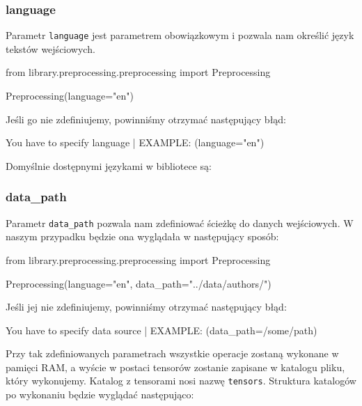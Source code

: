 \subsubsection{language}
Parametr \texttt{language} jest parametrem obowiązkowym i pozwala nam określić język tekstów wejściowych.
\begin{python}
from library.preprocessing.preprocessing import Preprocessing

Preprocessing(language="en")

\end{python}

Jeśli go nie zdefiniujemy, powinniśmy otrzymać następujący błąd:

\begin{consolerror}
You have to specify language | EXAMPLE: (language="en")
\end{consolerror}

Domyślnie dostępnymi językami w bibliotece są:

\languages 

\subsubsection{data\_path}
Parametr \texttt{data\_path} pozwala nam zdefiniować ścieżkę do danych wejściowych. W naszym przypadku
będzie ona wyglądała w następujący sposób:
\begin{python}
from library.preprocessing.preprocessing import Preprocessing

Preprocessing(language="en",
              data_path="../data/authors/")
                   
\end{python}

Jeśli jej nie zdefiniujemy, powinniśmy otrzymać następujący błąd:

\begin{consolerror}
You have to specify data source | EXAMPLE: (data_path=/some/path)
\end{consolerror}

Przy tak zdefiniowanych parametrach wszystkie operacje zostaną wykonane w pamięci RAM, a wyście w postaci
tensorów zostanie zapisane w katalogu pliku, który wykonujemy. Katalog z tensorami nosi nazwę \texttt{tensors}.
Struktura katalogów po wykonaniu będzie wyglądać następująco:

\myspace
{}
\myspace

